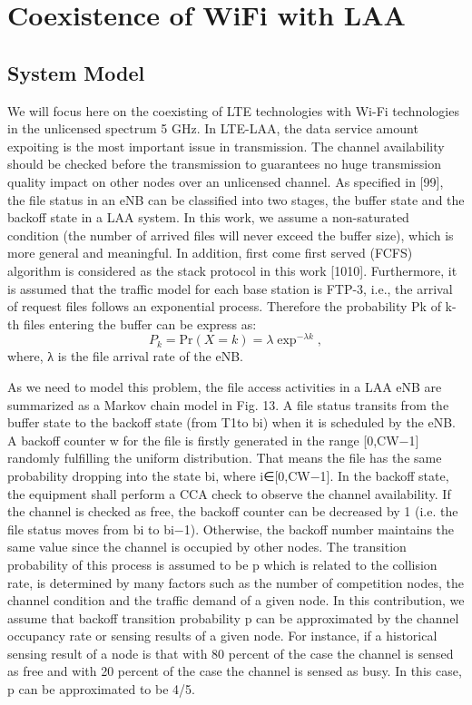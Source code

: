 \documentclass{IEEEtran}
\begin{document}
\section{Coexistence of WiFi with LAA}


\subsection{System Model}

 We will focus here on the coexisting of LTE technologies with Wi-Fi technologies in the unlicensed spectrum 5 GHz. In LTE-LAA, the data service amount expoiting is the most important issue in transmission. The channel availability should be checked before the transmission to guarantees no huge transmission quality impact on other nodes over an unlicensed channel. As specified in [99], the file status in an eNB can be classified into two stages, the buffer state and the backoff state in a LAA system. In this work, we assume a non-saturated condition (the number of arrived files will never exceed the buffer size), which is more general and meaningful. In addition, first come first served (FCFS) algorithm is considered as the stack protocol in this work [1010]. Furthermore, it is assumed that the traffic model for each base station is FTP-3, i.e., the arrival of request files follows an exponential process. Therefore the probability Pk of k-th files entering the buffer can be express as: 
 \begin{equation*}P_{k}=\text{Pr}(X=k)=\lambda\exp^{-\lambda k}, \tag{1}\end{equation*}
  where, λ is the file arrival rate of the eNB.

  \cite{Tao2015}
  
  As we need to model this problem, the file access activities in a LAA eNB are summarized as a Markov chain model in Fig. 13. A file status transits from the buffer state to the backoff state (from T1to bi) when it is scheduled by the eNB. A backoff counter w for the file is firstly generated in the range [0,CW−1] randomly fulfilling the uniform distribution. That means the file has the same probability dropping into the state bi, where i∈[0,CW−1]. In the backoff state, the equipment shall perform a CCA check to observe the channel availability. If the channel is checked as free, the backoff counter can be decreased by 1 (i.e. the file status moves from bi to bi−1). Otherwise, the backoff number maintains the same value since the channel is occupied by other nodes. The transition probability of this process is assumed to be p which is related to the collision rate, is determined by many factors such as the number of competition nodes, the channel condition and the traffic demand of a given node. In this contribution, we assume that backoff transition probability p can be approximated by the channel occupancy rate or sensing results of a given node. For instance, if a historical sensing result of a node is that with 80 percent of the case the channel is sensed as free and with 20 percent of the case the channel is sensed as busy. In this case, p can be approximated to be 4/5. \cite{Tao2015}
  
\end{document}

